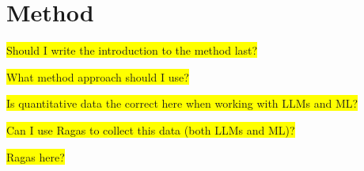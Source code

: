 



\section{Method}

\colorbox{yellow}{Should I write the introduction to the method last?}


\colorbox{yellow}{What method approach should I use?}



\colorbox{yellow}{Is quantitative data the correct here when working with LLMs
    and ML?}

\colorbox{yellow}{Can I use Ragas to collect this data (both LLMs and ML)?}






\colorbox{yellow}{Ragas here?}









